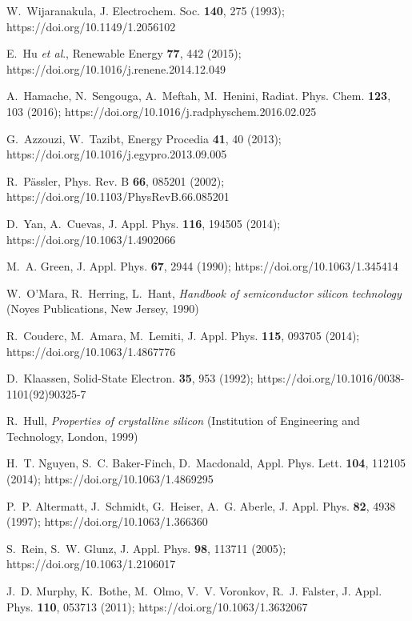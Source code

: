 \documentclass[12pt]{article}
\begin{document}
\begin{thebibliography}{99}
W.~Wijaranakula, J. Electrochem. Soc. \textbf{140}, 275 (1993);
https://doi.org/10.1149/1.2056102

E.~Hu \emph{et al}., Renewable Energy \textbf{77}, 442 (2015);
https://doi.org/10.1016/j.renene.2014.12.049

A.~Hamache, N.~Sengouga, A.~Meftah, M.~Henini, Radiat. Phys. Chem. \textbf{123}, 103 (2016);
https://doi.org/10.1016/j.radphyschem.2016.02.025

G.~Azzouzi, W.~Tazibt, Energy Procedia \textbf{41}, 40 (2013);
https://doi.org/10.1016/j.egypro.2013.09.005

R.~P\"assler, Phys. Rev. B \textbf{66}, 085201 (2002);
https://doi.org/10.1103/PhysRevB.66.085201

D.~Yan, A.~Cuevas, J. Appl. Phys. \textbf{116}, 194505 (2014);
https://doi.org/10.1063/1.4902066

M.~A. Green, J. Appl. Phys. \textbf{67}, 2944 (1990);
https://doi.org/10.1063/1.345414

W.~O'Mara, R.~Herring, L.~Hant, \emph{Handbook of semiconductor silicon technology}
(Noyes Publications, New Jersey, 1990)

R.~Couderc, M.~Amara, M.~Lemiti, J. Appl. Phys. \textbf{115}, 093705 (2014);
https://doi.org/10.1063/1.4867776

D.~Klaassen, Solid-State Electron. \textbf{35}, 953 (1992);
https://doi.org/10.1016/0038-1101(92)90325-7

R.~Hull, \emph{Properties of crystalline silicon} (Institution of Engineering and
  Technology, London, 1999)

H.~T. Nguyen, S.~C. Baker-Finch, D.~Macdonald, Appl. Phys. Lett. \textbf{104}, 112105 (2014);
https://doi.org/10.1063/1.4869295

P.~P. Altermatt, J.~Schmidt, G.~Heiser, A.~G. Aberle,
J. Appl. Phys. \textbf{82}, 4938 (1997);
https://doi.org/10.1063/1.366360

S.~Rein, S.~W. Glunz, J. Appl. Phys.
  \textbf{98}, 113711 (2005);
  https://doi.org/10.1063/1.2106017

J.~D. Murphy, K.~Bothe, M.~Olmo, V.~V. Voronkov, R.~J. Falster,
 J. Appl. Phys. \textbf{110}, 053713 (2011);
https://doi.org/10.1063/1.3632067


\end{thebibliography}
\end{document}
